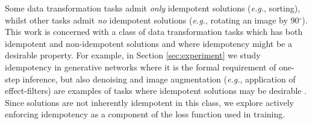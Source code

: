 \documentclass{article}
\theoremstyle{plain}
\theoremstyle{definition}
\theoremstyle{remark}
\begin{document}
Some data transformation tasks admit \textit{only} idempotent solutions (\textit{e.g.}, sorting), whilst other tasks admit \textit{no} idempotent solutions (\textit{e.g.}, rotating an image by 90$^{\circ}$). This work is concerned with a class of data transformation tasks which has both idempotent and non-idempotent solutions and where idempotency might be a desirable property. For example, in Section \ref{sec:experiment} we study idempotency in generative networks where it is the formal requirement of one-step inference, but also denoising and image augmentation (\textit{e.g.}, application of effect-filters) are examples of tasks where idempotent solutions may be desirable \cite{liu-gans,mao-deblurring}. Since solutions are not inherently idempotent in this class, we explore actively enforcing idempotency as a component of the loss function used in training.

\end{document}
